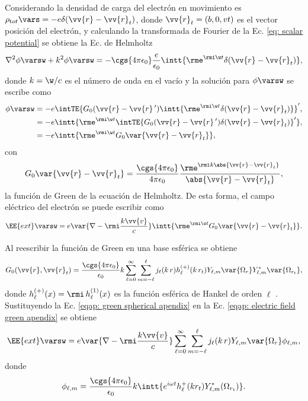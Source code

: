 Considerando la densidad de carga del electrón en movimiento es $\rho_{\text tot}\vars = -e \delta(\vv{r}-\vv{r}_t)$, donde $\vv{r}_t = (b,0,vt)$ es el vector posición del electrón, y calculando la transformada de Fourier de la Ec. \eqref{eq: scalar potential} se obtiene la Ec. de Helmholtz
\begin{equation}
\nabla^2\phi\varsw + k^2\phi\varsw = -\cgs{4\pi\epsilon_0}\frac{e}{\epsilon_0}\intt{\rme^{\rmi \w t} \delta(\vv{r}-\vv{r}_t)},
\end{equation}
donde $k = \w/c$ es el número de onda en el vacío y la solución para $\phi\varsw$ se escribe como \cite{maciel2019electromagnetic, de1999relativistic, barton1989elements} 
\begin{align}
\phi\varsw &= -e\intTE{G_0(\vv{r}-\vv{r}\,^{\prime})\intt{\rme^{\rmi \w t}\delta(\vv{r}-\vv{r}_t)}}^{\prime},\\
		   &= -e\intt{\rme^{\rmi \w t} \intTE{ G_0(\vv{r}-\vv{r}\,^{\prime}) \delta(\vv{r}-\vv{r}_t)}^{\prime}},\\
		   &= -e\intt{\rme^{\rmi \w t}G_0\var{\vv{r}-\vv{r}_t}},
\end{align}
con 
\begin{equation}
G_0\var{\vv{r}-\vv{r}_t} = \frac{\cgs{4\pi\epsilon_0}}{4\pi\epsilon_0}\frac{\rme^{\rmi k \abs{\vv{r}-\vv{r}_t}}}{\abs{\vv{r}-\vv{r}_t}},
\end{equation}
la función de Green de la ecuación de Helmholtz. De esta forma, el campo eléctrico del electrón se puede escribir como
\begin{equation}
\EE{ext}\varsw = e\var{\nabla-\rmi \frac{k\vv{v}}{c}} \intt{\rme^{\rmi \w t} G_0 \var{\vv{r}-\vv{r}_t}}. 
\label{eqap: electric field green apendix}
\end{equation}

Al reescribir la función de Green en una base esférica se obtiene \cite{de1999relativistic}
\begin{equation}
G_0(\vv{r},\vv{r}_t)=\frac{\cgs{4\pi\epsilon_0}}{\epsilon_0} k \sum_{\ell=0}^{\infty}\sum_{m=-\ell}^{\ell} j_{\ell}(k \, r) h_{\ell}^{(+)}(k \, r_t) Y_{\ell,m}\var{\Omega_r} Y_{\ell, m}^{*}\var{\Omega_{r_t}}, \label{eqap: green spherical apendix}
\end{equation}
donde $h_{\ell}^{(+)}(x)= \rmi \, h_{\ell}^{(1)}(x)$ es la función esférica de Hankel de orden $\ell$ \cite{Abramowitz}. Sustituyendo la Ec. \eqref{eqap: green spherical apendix} en la Ec. \eqref{eqap: electric field green apendix} se obtiene
\begin{equation}
\EE{ext}\varsw = e\var{\nabla-\rmi \frac{k\vv{v}}{c}} \sum_{\ell=0}^{\infty}\sum_{m=-\ell}^{\ell} j_{\ell}(k \, r) Y_{\ell,m}\var{\Omega_r} \phi_{\ell, m},
\label{eqap: ext electric field spherical}
\end{equation}
donde 
\begin{equation}
\phi_{\ell, m} = \frac{\cgs{4\pi\epsilon_0}}{\epsilon_0} k \intt{e^{i \omega t} h_{\ell}^{+}(k r_{t}) Y_{\ell, m}^{*}(\Omega_{r_t}) }.
\label{eqap: phi lm apendix}
\end{equation}

